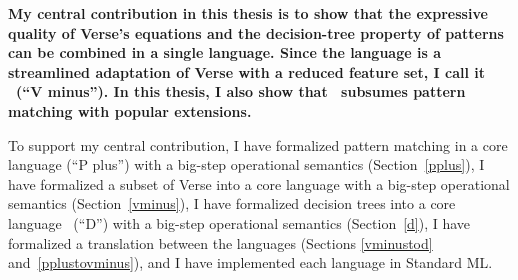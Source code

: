 \documentclass[manuscript,screen,review, 12pt, nonacm]{acmart}
\begin{document}

\bf{My central contribution in this thesis} is to show that the expressive
quality of Verse's equations and the decision-tree property of patterns can be
combined in a single language. Since the language is a streamlined adaptation of
Verse with a reduced feature set, I call it \VMinus\ (“V minus”). In this thesis,
I also show that \VMinus\ subsumes pattern matching with popular extensions. 

To support my central contribution, 
I have formalized pattern matching in a core language \PPlus (“P plus”) with a
big-step operational semantics (Section~\ref{pplus}),
I have formalized a subset of Verse into a core language \VMinus with a big-step
operational semantics (Section~\ref{vminus}), 
I have formalized decision trees into a core language \D\ (“D”) with a big-step
operational semantics (Section~\ref{d}), 
I have formalized a translation between
the languages (Sections \ref{vminustod} and~\ref{pplustovminus}), 
and I have implemented each language in Standard ML. 
\end{document}
